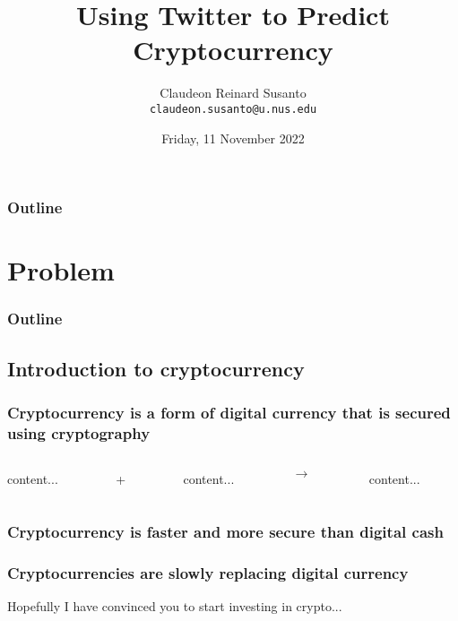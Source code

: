 \documentclass{beamer}
\title{Using Twitter to Predict Cryptocurrency}
\author[Claudeon]{Claudeon Reinard Susanto \\ \texttt{claudeon.susanto@u.nus.edu}}
\date[11 Nov '22]{Friday, 11 November 2022}
\begin{document}
\begin{frame}[plain]
    \maketitle
\end{frame}

\begin{frame}[plain]
	\frametitle{Outline}
	\tableofcontents[hideothersubsections]
\end{frame}

\section{Problem}
\begin{frame}
	\frametitle{Outline}
	\tableofcontents[hideothersubsections]
\end{frame}

\subsection{Introduction to cryptocurrency}
\begin{frame}
	\frametitle{Cryptocurrency is a form of digital currency that is secured using cryptography}
	\begin{columns}[t]
		\begin{column}{0.3\textwidth}
			content...
		\end{column}
	\begin{column}{0.05\textwidth}
		+
	\end{column}
	\begin{column}{0.3\textwidth}
		content...
	\end{column}
\begin{column}{0.05\textwidth}
	$\rightarrow$
\end{column}
\begin{column}{0.3\textwidth}
	content...
\end{column}
	\end{columns}
\end{frame}
\begin{frame}
	\frametitle{Cryptocurrency is faster and more secure than digital cash}
\end{frame}
\begin{frame}
	\frametitle{Cryptocurrencies are slowly replacing digital currency}
\end{frame}
\begin{frame}[plain]
	\centering \Large{Hopefully I have convinced you to start investing in crypto...}
\end{frame}
\end{document}
